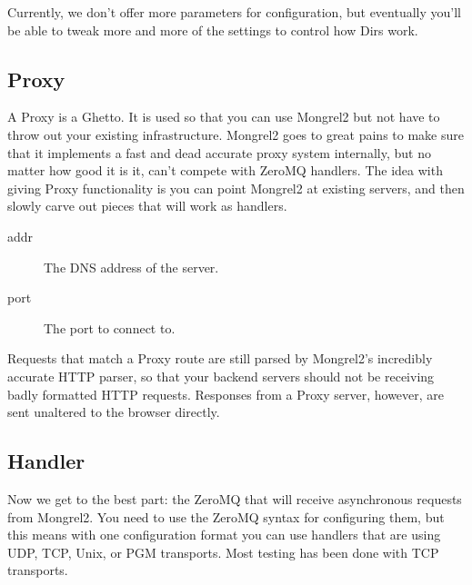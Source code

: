 Currently, we don't offer more parameters for configuration, but eventually you'll be able to tweak more and
more of the settings to control how Dirs work.

\subsection{Proxy}

A Proxy is a Ghetto.  It is used so that you can use Mongrel2 but not have to throw
out your existing infrastructure.  Mongrel2 goes to great pains to make sure that it
implements a fast and dead accurate proxy system internally, but no matter how good it
is it, can't compete with ZeroMQ handlers.  The idea with giving Proxy functionality is
you can point Mongrel2 at existing servers, and then slowly carve out pieces that
will work as handlers.


\begin{description}
\item[addr] The DNS address of the server.
\item[port] The port to connect to.
\end{description}

Requests that match a Proxy route are still parsed by Mongrel2's incredibly accurate
HTTP parser, so that your backend servers should not be receiving badly formatted
HTTP requests.  Responses from a Proxy server, however, are sent unaltered to the
browser directly.


\subsection{Handler}

Now we get to the best part: the ZeroMQ  that will receive asynchronous requests
from Mongrel2.  You need to use the ZeroMQ syntax for configuring them, but this means with one
configuration format you can use handlers that are using UDP, TCP, Unix, or PGM transports.  Most
testing has been done with TCP transports.

